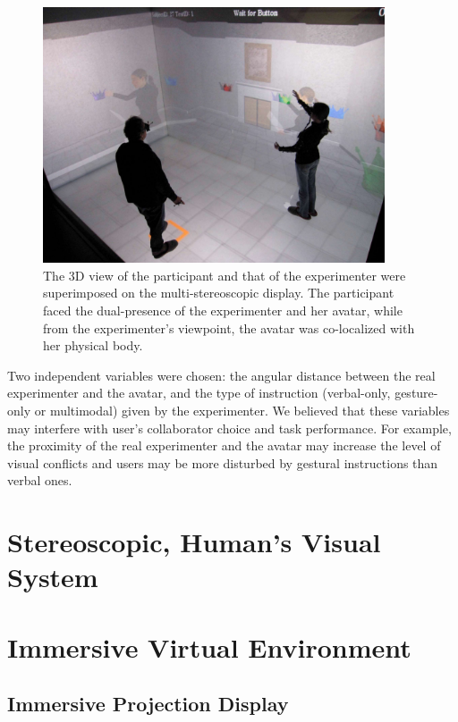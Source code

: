 \begin{figure}[ht]
  \centering
  \includegraphics[width=0.9\textwidth]{figures/2_demo}
  \caption{\label{fig:2_demo}The 3D view of the participant and that of the experimenter were superimposed on the multi-stereoscopic display. The participant faced the dual-presence of the experimenter and her avatar, while from the experimenter's viewpoint, the avatar was co-localized with her physical body.}
\end{figure}

Two independent variables were chosen: the angular distance between the real experimenter and the avatar, and the type of instruction (verbal-only, gesture-only or multimodal) given by the experimenter. We believed that these variables may interfere with user's collaborator choice and task performance. For example, the proximity of the real experimenter and the avatar may increase the level of visual conflicts and users may be more disturbed by gestural instructions than verbal ones.


\section{Stereoscopic, Human's Visual System}

\section{Immersive Virtual Environment}


\subsection{Immersive Projection Display}

